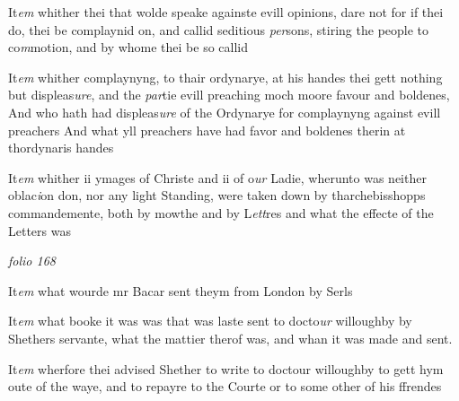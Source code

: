 \documentclass[12pt, a4paper]{book}
\begin{document}
            			
            				
		\ifthenelse{\isodd{\thepage}}
		{\reversemarginpar}
		{\normalmarginpar}
		It\textit{em} whither thei that wolde speake againste evill opinions, dare not for if thei do, thei be complaynid on, and callid seditious \textit{per}sons, stiring the people to co\textit{m}motion, and by whome thei be so callid
            			
            		
            					
				\marginpar[\vspace{0.5cm}{\textcolor{Gray}{11}}]{}
			
            					
		\ifthenelse{\isodd{\thepage}}
		{\reversemarginpar}
		{\normalmarginpar}
		It\textit{em} whither complaynyng, to thair ordynarye, at his handes thei gett nothing but displeas\textit{ure}, and the \textit{par}tie evill preaching moch moore favour and boldenes, And who hath had displeas\textit{ure} of the  Ordynarye for complaynyng against evill preachers And what  yll preachers have had favor and boldenes therin at thordynaris handes
			
            		
            			
				\marginpar[\vspace{0.5cm}{\textcolor{Gray}{12}}]{}
			
            			
		\ifthenelse{\isodd{\thepage}}
		{\reversemarginpar}
		{\normalmarginpar}
		It\textit{em} whither ii ymages of Christe and ii of o\textit{ur} Ladie, wherunto was neither oblac\textit{i}on don, nor any light Standing, were taken down by tharchebisshopps commandemente, both by mowthe and by L\textit{ett}res and what the effecte of the Letters was

\dotfill
						\newpage
{}

\textit{folio 168}


 	
		\ifthenelse{\isodd{\thepage}}
		{\reversemarginpar}
		{\normalmarginpar}
		It\textit{em} what wourde mr Bacar sent theym from London by Serls
 	
		\ifthenelse{\isodd{\thepage}}
		{\reversemarginpar}
		{\normalmarginpar}
		It\textit{em} what booke
			 it was was that was laste sent to docto\textit{ur} willoughby by Shethers servante, what the mattier therof was, and whan it was made and sent.
 	
		\ifthenelse{\isodd{\thepage}}
		{\reversemarginpar}
		{\normalmarginpar}
		It\textit{em} wherfore thei advised Shether to write to doctour willoughby to gett hym oute of the waye, and to repayre to the Courte or to some other of his ffrendes
 	
\end{document}
